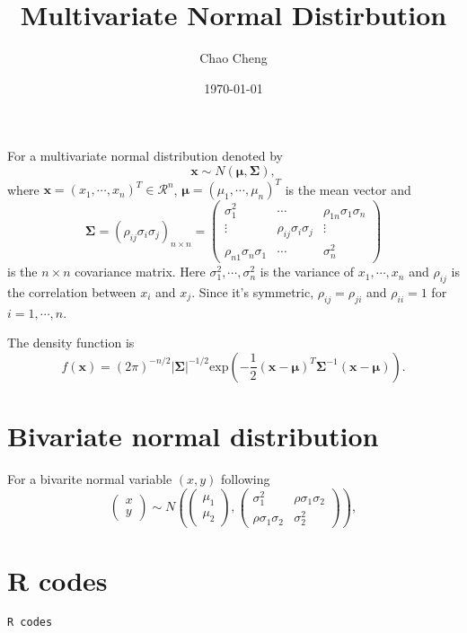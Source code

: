 \documentclass[a4paper,12pt]{article}
\title{Multivariate Normal Distirbution}
\author{Chao Cheng}
\date{\today}
\begin{document}
\maketitle

For a multivariate normal distribution denoted by
\[
  \bm{x} \sim
  N\left(
    \bm{\mu}, \bm{\Sigma}
  \right)
  ,
\]
where $\bm{x} = \left(x_1, \cdots, x_n\right)^T\in\mathcal{R}^n$, $\bm{\mu} = \left(\mu_1, \cdots, \mu_n\right)^T$ is the mean vector and
\[
  \bm{\Sigma} = \left(
    \rho_{ij}\sigma_i\sigma_j
  \right)_{n\times n}
  =
  \begin{pmatrix}
    \sigma_1^2 & \cdots & \rho_{1n}\sigma_1\sigma_n    \\
    \vdots & \rho_{ij}\sigma_i\sigma_j & \vdots    \\
    \rho_{n1}\sigma_n\sigma_1 & \cdots & \sigma_n^2
  \end{pmatrix}
\]
is the $n\times n$ covariance matrix. Here $\sigma_1^2, \cdots, \sigma_n^2$ is the variance of $x_1, \cdots, x_n$ and $\rho_{ij}$ is the correlation between $x_i$ and $x_j$. Since it's symmetric, $\rho_{ij} = \rho_{ji}$ and $\rho_{ii} = 1$ for $i = 1, \cdots, n$.
\par
The density function is
\[
  f\left(\bm{x}\right) =
  \left(2\pi\right)^{-n / 2}
  \left|\bm{\Sigma}\right|^{-1 / 2}
  \mathrm{exp}\left(
    -\frac{1}{2}
    \left(\bm{x} - \bm{\mu}\right)^T
    \bm{\Sigma}^{-1}
    \left(\bm{x} - \bm{\mu}\right)
  \right)
  .
\]

\section{Bivariate normal distribution}
\label{sec:bivar-norm-distr}

For a bivarite normal variable $\left(x, y\right)$ following
\[
  \begin{pmatrix}
    x    \\
    y
  \end{pmatrix}
  \sim N\left(
    \begin{pmatrix}
      \mu_1    \\
      \mu_2
    \end{pmatrix},
    \begin{pmatrix}
      \sigma_1^2 & \rho\sigma_1\sigma_2    \\
      \rho\sigma_1\sigma_2 & \sigma_2^2
    \end{pmatrix}
  \right)
  ,
\]







\clearpage
\appendix

\section{R codes}
\begin{verbatim}
R codes
\end{verbatim}
\end{document}
